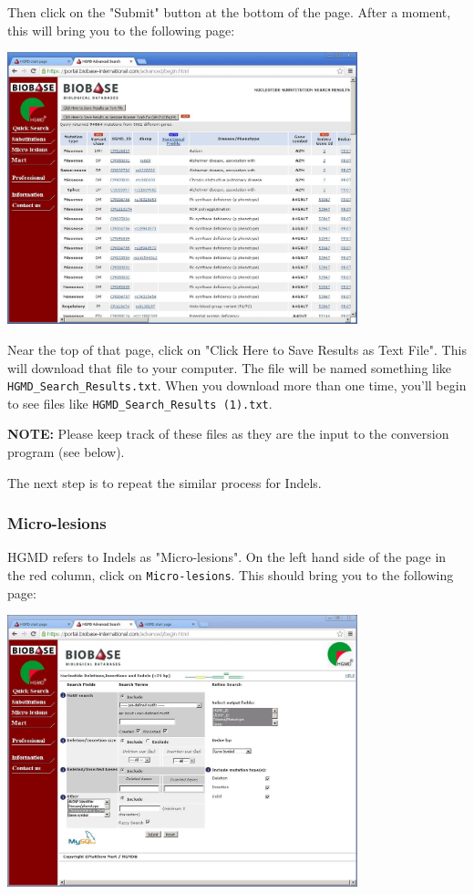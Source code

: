 \documentclass[11pt,titlepage,a4paper]{article}
\begin{document}
Then click on the "Submit" button at the bottom of the page. After a moment, this will bring you to the following page:

\begin{center}
\includegraphics[width=4in]{advancedsnpchrresults.JPG}
\end{center}

Near the top of that page, click on "Click Here to Save Results as Text File". This will download that file to your computer. The file will be named something like \texttt{HGMD\_Search\_Results.txt}. When you download more than one time, you'll begin to see files like \texttt{HGMD\_Search\_Results (1).txt}.

{\bf NOTE:} Please keep track of these files as they are the input to the conversion program (see below). \vspace{1em}

The next step is to repeat the similar process for Indels.

\subsubsection{Micro-lesions}

HGMD refers to Indels as "Micro-lesions". On the left hand side of the page in the red column, click on \texttt{Micro-lesions}. This should bring you to the following page:

\begin{center}
\includegraphics[width=4in]{advancedindel.JPG}
\end{center}
\end{document}
